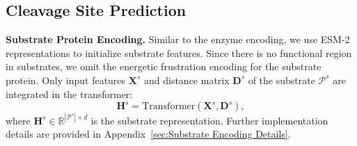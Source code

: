 \subsection{Cleavage Site Prediction}

\textbf{Substrate Protein Encoding.} Similar to the enzyme encoding, we use ESM-2 representations to initialize substrate features. Since there is no functional region in substrates, we omit the energetic frustration encoding for the substrate protein. Only input features $\mathbf{X}^s$ and distance matrix $\mathbf{D}^s$ of the substrate $\mathcal{P}^s$ are integrated in the transformer:
\begin{equation}
    \mathbf{H}^s = \mathrm{Transformer}(\mathbf{X}^s, \mathbf{D}^s),
    \label{eq:subencoder}
\end{equation}
where $\mathbf{H}^s \in \mathbb{R}^{|\mathcal{P}^s|\times d}$ is the substrate representation.
Further implementation details are provided in Appendix~\ref{sec:Substrate Encoding Details}. 





